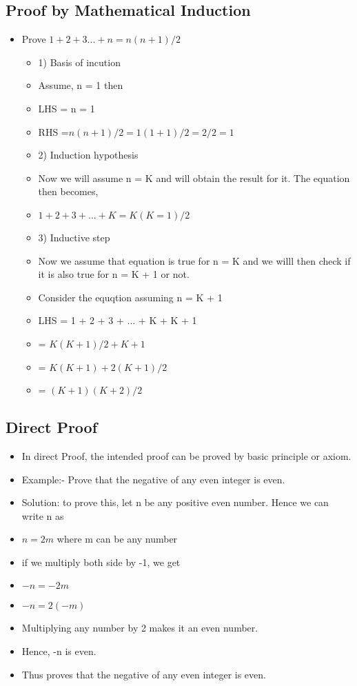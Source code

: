 \documentclass{article}
\begin{document}
\subsection{Proof by Mathematical Induction}
\begin{itemize}
	\item Prove $ 1+ 2+3...+n = n(n+1)/2$
	\begin{itemize}
		\item 1) Basis of incution
		\item Assume, n = 1 then 
		\item LHS = n = 1
		\item RHS =$ n(n+1)/2 = 1 (1+1)/2 = 2/2 =1$
		\item 2) Induction hypothesis
		\item Now we will assume n = K and will obtain the result for it. The equation then becomes,
		\item $ 1 + 2 + 3 + ... + K = K(K=1)/2 $
		\item 3) Inductive step
		\item Now we assume that equation is true for n = K and we willl then check if it is also true for n = K + 1 or not.
		\item Consider the equqtion assuming n = K + 1
		\item LHS = 1 + 2 + 3 + ... + K + K  + 1
		\item = $ K ( K + 1)/2 + K + 1$	
		\item = $ K ( K + 1) + 2 (K + 1)/2$
		\item = $ ( K + 1) ( K + 2)/2$
	\end{itemize}
\end{itemize}
\subsection{Direct Proof}
\begin{itemize}
	\item In direct Proof, the intended proof can be proved by basic principle or axiom.
	\item Example:- Prove that the negative of any even integer is even.
	\item Solution: to prove this, let n be any positive even number. Hence we can write n as 
	\item $n = 2m$		where m can be any number
	\item if we multiply both side by -1, we get 
	\item $-n = -2m$
	\item $-n = 2 (-m)$
	\item Multiplying any number by 2 makes it an even number.
	\item Hence, -n is even.
	\item Thus proves that the negative of any even integer is even.
\end{itemize}
\end{document}
